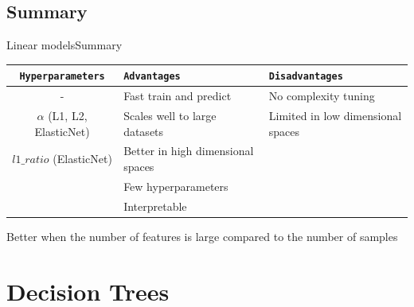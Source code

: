 \documentclass[10pt,compress]{beamer} %
\begin{document}
\subsection{Summary}
\begin{frame}{Linear models}{Summary}
	\begin{center}
	\begin{tabular}{cp{3cm}p{3cm}}\hline
	 	\texttt{Hyperparameters}  & \texttt{Advantages}  & \texttt{Disadvantages} \\\hline
	 	 -                        & Fast train and predict        & No complexity tuning  \\
	 	 $\alpha$ (L1, L2, ElasticNet) & Scales well to large datasets & Limited in low dimensional spaces  \\
	 	 $l1\_ratio$ (ElasticNet) & Better in high dimensional spaces  &   \\
	 	                          & Few hyperparameters           &   \\
	 	                          & Interpretable                 &   \\
	 	\hline
	\end{tabular}
    \end{center}

    Better when the number of features is large compared to the number of samples

\end{frame}

\section{Decision Trees}
\end{document}
